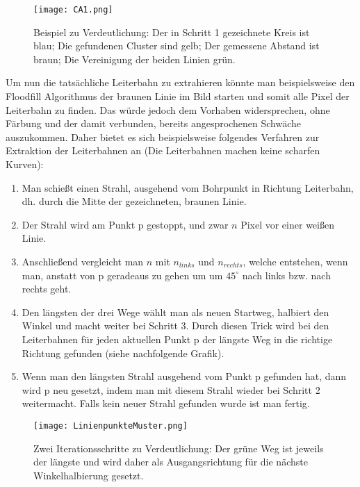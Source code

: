 \begin{figure}[H]
  \begin{center}
    \texttt{[image: CA1.png]}
    \caption{Beispiel zu Verdeutlichung: Der in Schritt 1 gezeichnete Kreis ist blau; Die gefundenen Cluster sind gelb; Der gemessene Abstand ist braun; Die Vereinigung der beiden Linien grün.}
    \label{fig:l_alg_1}
  \end{center}
\end{figure}

Um nun die tatsächliche Leiterbahn zu extrahieren könnte man beispielsweise den Floodfill Algorithmus der braunen Linie im Bild starten und somit alle Pixel der Leiterbahn zu finden. Das würde jedoch dem Vorhaben widersprechen, ohne Färbung und der damit verbunden, bereits angesprochenen Schwäche auszukommen. \newline
Daher bietet es sich beispielsweise folgendes Verfahren zur Extraktion der Leiterbahnen an (Die Leiterbahnen machen keine scharfen Kurven): \newline

\begin{enumerate}
\item Man schießt einen Strahl, ausgehend vom Bohrpunkt in Richtung Leiterbahn, dh. durch die Mitte der gezeichneten, braunen Linie.
\item Der Strahl wird am Punkt p gestoppt, und zwar $n$ Pixel vor einer weißen Linie.
\item Anschließend vergleicht man $n$ mit $n_{links}$ und $n_{rechts}$, welche entstehen, wenn man, anstatt von p geradeaus zu gehen um um $45^\circ$ nach links bzw. nach rechts geht. 
\item Den längsten der drei Wege wählt man als neuen Startweg, halbiert den Winkel und macht weiter bei Schritt 3. Durch diesen Trick wird bei den Leiterbahnen für jeden aktuellen Punkt p der längste Weg in die richtige Richtung gefunden (siehe nachfolgende Grafik).
\item Wenn man den längsten Strahl ausgehend vom Punkt p gefunden hat, dann wird p neu gesetzt, indem man mit diesem Strahl wieder bei Schritt 2 weitermacht. Falls kein neuer Strahl gefunden wurde ist man fertig.
\end{enumerate}

\begin{figure}[H]
  \begin{center}
    \texttt{[image: LinienpunkteMuster.png]}
    \caption{Zwei Iterationsschritte zu Verdeutlichung: Der grüne Weg ist jeweils der längste und wird daher als Ausgangsrichtung für die nächste Winkelhalbierung gesetzt.}
    \label{fig:linepoints}
  \end{center}
\end{figure}

